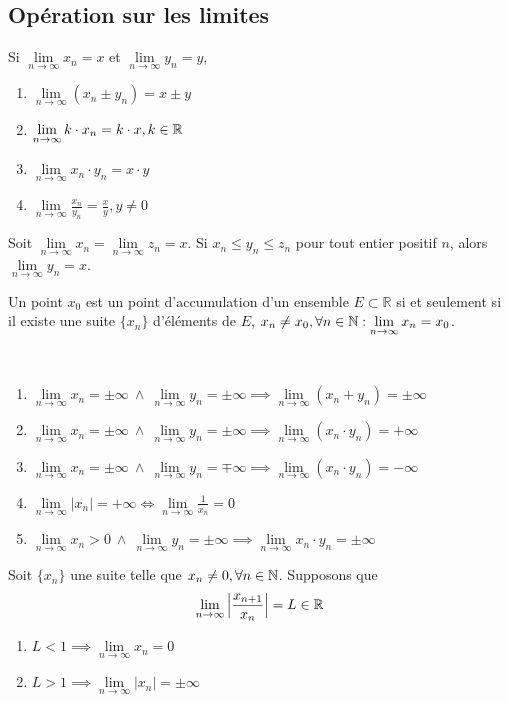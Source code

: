 \subsection{Opération sur les limites}
	\begin{mythm}
		Si $\lim\limits_{n\to\infty}x_n =x$ et $\lim\limits_{n\to\infty}y_n=y$,
		\begin{enumerate}
			\item $\lim\limits_{n\to\infty}(x_n\pm y_n)=x\pm y$
			\item $\lim\limits_{n\to\infty}k\cdot x_n=k\cdot x, k\in\mathbb{R}$
			\item $\lim\limits_{n\to\infty}x_n\cdot y_n=x\cdot y$
			\item $\lim\limits_{n\to\infty}\frac{x_n}{y_n}=\frac{x}{y}, y\neq 0$
		\end{enumerate}
	\end{mythm}
	\begin{mythm}
		Soit $\lim\limits_{n\to\infty}x_n=\lim\limits_{n\to\infty}z_n=x$. Si $x_n\leq y_n\leq z_n$ pour tout entier positif $n$, alors $\lim\limits_{n\to\infty}y_n=x$.
	\end{mythm}
	\begin{mythm}
		Un point $x_0$ est un point d'accumulation d'un ensemble $E\subset\mathbb{R}$ si et seulement si il existe une suite $\{x_n\}$ d'éléments de $E$, $x_n\neq x_0,\forall n\in\mathbb{N} : \lim\limits_{n\to\infty}x_n=x_0$.
	\end{mythm}
	\begin{mythm}
		~
		\begin{enumerate}
			\item $\lim\limits_{n\to\infty}x_n=\pm\infty~\wedge~\lim\limits_{n\to\infty}y_n=\pm\infty\implies \lim\limits_{n\to\infty}(x_n + y_n)=\pm\infty$
			\item $\lim\limits_{n\to\infty}x_n=\pm\infty~\wedge~\lim\limits_{n\to\infty}y_n=\pm\infty\implies \lim\limits_{n\to\infty}(x_n\cdot y_n)=+\infty$
			\item $\lim\limits_{n\to\infty}x_n=\pm\infty~\wedge~\lim\limits_{n\to\infty}y_n=\mp\infty\implies \lim\limits_{n\to\infty}(x_n\cdot y_n)=-\infty$
			\item $\lim\limits_{n\to\infty}|x_n|=+\infty\Longleftrightarrow\lim\limits_{n\to\infty}\frac{1}{x_n}=0$
			\item $\lim\limits_{n\to\infty}x_n>0~\wedge~\lim\limits_{n\to\infty}y_n=\pm\infty\implies\lim\limits_{n\to\infty}x_n\cdot y_n=\pm\infty$
		\end{enumerate}
	\end{mythm}
	\begin{mythm}
		Soit $\{x_n\}$ une suite telle que $x_n\neq 0,\forall n \in\mathbb{N}$. Supposons que \[\lim_{n\to\infty}\Big|\frac{x_{n+1}}{x_n}\Big|=L\in\mathbb{R}\]
		\begin{enumerate}[label =\alph*)]
			\item $L<1 \implies\lim\limits_{n\to\infty}x_n=0 $
			\item $L>1\implies\lim\limits_{n\to\infty}|x_n|=\pm\infty$
		\end{enumerate}
	\end{mythm}
